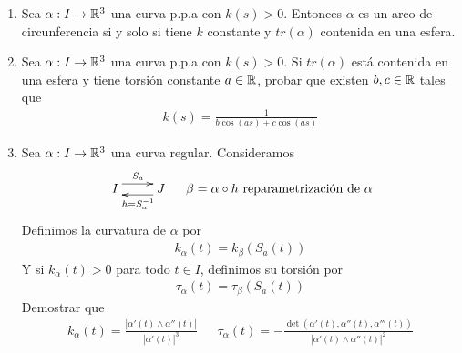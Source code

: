 \begin{ejercicio}
\begin{enumerate}
        Como $(\frac{1}{k})' = -\frac{k'}{k^2} < 0$ por la condición \textit{ad-hoc} del enunciado nos queda que necesariamente
        \begin{gather*}
            \frac{\tau}{k} + \left[\frac{1}{\tau} \left(\frac{1}{k}\right)' \right]' = 0
        \end{gather*}
        Lo que finalmente, al sustituir en $f'$ nos dice $f'\equiv 0$, o equivalentemente, $f(s) = a$ para todo $s\in I$, es decir
        \begin{align*}
            a &= \alpha + \frac{1}{k}N - \frac{1}{\tau}\left(\frac{1}{k}\right)'B\\
            a-\alpha &= \frac{1}{k}N - \frac{1}{\tau}\left(\frac{1}{k}\right)'B\\
            |\alpha - a|^2 &= \frac{1}{k^2} - \left[\frac{1}{\tau}\left(\frac{1}{k}\right)'\right]^2 = R^2
        \end{align*}
        Lo que nos dice que $tr(\alpha)\subset S^2(a, R)$.

        \item Sea $\alpha : I \to \mathbb{R}^3$ una curva p.p.a con $k(s)>0$. Entonces $\alpha$ es un arco de circunferencia si y solo si tiene $k$ constante y $tr(\alpha)$ contenida en una esfera.
        
        \item Sea $\alpha:I\to \mathbb{R}^3$ una curva p.p.a con $k(s)>0$. Si $tr(\alpha)$ está contenida en una esfera y tiene torsión constante $a\in \mathbb{R}$, probar que existen $b,c\in \mathbb{R}$ tales que 
        \begin{gather*}
            k(s) = \frac{1}{b\cos(as) + c\cos(as)}
        \end{gather*}

        \item Sea $ \alpha : I \to \mathbb{R}^3$ una curva regular. Consideramos 
        \begin{gather*}
            \xymatrix{
                I \ar@<1ex>[r]^{S_a} & J \ar@<1ex>[l]^{h=S_a^{-1}}
            }\ \ \ \ \beta = \alpha \circ h \text{ reparametrización de }\alpha
        \end{gather*}
        Definimos la curvatura de $\alpha$ por 
        \begin{gather*}
            k_\alpha(t) = k_\beta(S_a(t))
        \end{gather*}
        Y si $k_\alpha(t)>0$ para todo $t\in I$, definimos su torsión por 
        \begin{gather*}
            \tau_\alpha(t) = \tau_\beta(S_a(t))
        \end{gather*}
        Demostrar que 
        \begin{gather*}
            k_\alpha(t) = \frac{|\alpha'(t) \wedge \alpha''(t)|}{|\alpha'(t)|^3}\ \ \ \ \ \ \ \tau_\alpha(t) = - \frac{\det(\alpha'(t), \alpha''(t), \alpha'''(t))}{|\alpha'(t) \wedge \alpha''(t)|^2}
        \end{gather*}
    \end{enumerate}
\end{ejercicio}

